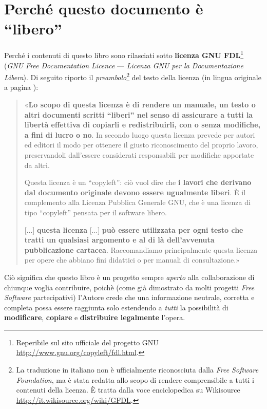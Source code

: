 \chapter{Perché questo documento è ``libero''}

Perché i contenuti di questo libro sono rilasciati sotto \textbf{licenza GNU FDL}\footnote{Reperibile sul sito ufficiale del progetto GNU \url{http://www.gnu.org/copyleft/fdl.html}.} (\emph{GNU Free Documentation Licence} --- \emph{Licenza GNU per la Documentazione Libera}). Di seguito riporto il \emph{preambolo}\footnote{La traduzione in italiano non è ufficialmente riconosciuta dalla \emph{Free Software Foundation}, ma è stata redatta allo scopo di rendere comprensibile a tutti i contenuti della licenza. È tratta dalla voce enciclopedica su Wikisource \url{http://it.wikisource.org/wiki/GFDL}.} del testo della licenza (in lingua originale a pagina \pageref{par:0.-PREAMBLE}):

\begin{quotation}
	{\small «}\textbf{\small Lo scopo di questa licenza è di rendere un manuale, un testo o altri documenti scritti ``liberi'' nel senso di assicurare a tutti la libertà effettiva di copiarli e redistribuirli, con o senza modifiche, a fini di lucro o no}{\small .  In secondo luogo questa licenza prevede per autori ed editori il modo per ottenere il giusto riconoscimento del proprio lavoro, preservandoli dall'essere considerati responsabili per modifiche apportate da altri.}{\small \par}

	{\small Questa licenza è un ``copyleft'': ciò vuol dire che }\textbf{\small i lavori che derivano dal documento originale devono essere ugualmente liberi}{\small . È il complemento alla Licenza Pubblica Generale GNU, che è una licenza di tipo ``copyleft'' pensata per il software libero.}{\small \par}

	{\small {[}...{]} }\textbf{\small questa licenza}{\small{} {[}...{]} }\textbf{\small può essere utilizzata per ogni testo che tratti un qualsiasi argomento e al di là dell'avvenuta pubblicazione cartacea}{\small .  Raccomandiamo principalmente questa licenza per opere che abbiano fini didattici o per manuali di consultazione.»}{\small \par}

\end{quotation}

Ciò significa che questo libro è un progetto sempre \emph{aperto} alla collaborazione di chiunque voglia contribuire, poichè (come già dimostrato da molti progetti \emph{Free Software} partecipativi) l'Autore crede che una informazione neutrale, corretta e completa possa essere raggiunta solo estendendo a \emph{tutti} la possibilità di \textbf{modificare}, \textbf{copiare} e \textbf{distribuire legalmente} l'opera.

